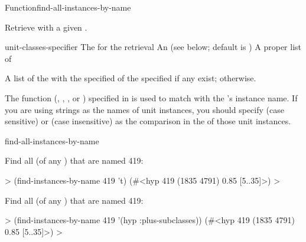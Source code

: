 \documentclass[10pt,twoside,english,pdftex]{article}
\begin{document}

\begin{functiondoc}{Function}{find-all-instances-by-name}%
  {
      
    \returns{} } 
%
%
%

\fnsyntax

\fnpurpose Retrieve  with a given .

\fnpackage {}

\fnmodule {}

\fnargs
\begin{args}{unit-classes-specifier}
 The  for the retrieval
 An 
(see below; default is )
 A proper list of 
\end{args}

\fnreturns A list of the  with the specified
 of the specified  if any exist; \nil{} otherwise.

\fndsyntax
\W\supp\tabletop
\unitclassspec
\subclassingspec

\fndescription The  function (,
, , or ) specified in
\textbf{} is used to match 
with the 's instance name.  If you are using strings as
the names of unit instances, you should specify  (case sensitive)
or  (case insensitive) as the comparison  in the
 of those unit instances.

\begin{alsos}{find-all-instances-by-name}
\end{alsos}

\fnexamples
Find all  (of any ) that are named
419:
%
\W\supp
\begin{example}
  > (find-instances-by-name 419 't)
  (#<hyp 419 (1835 4791) 0.85 [5..35]>)
  >
\end{example}
%
Find all  (of any ) that are named
419:
%
\W\supp\notpretop
\begin{example}
  > (find-instances-by-name 419 '(hyp :plus-subclasses))
  (#<hyp 419 (1835 4791) 0.85 [5..35]>)
  >
\end{example}

\end{functiondoc}
\end{document}
